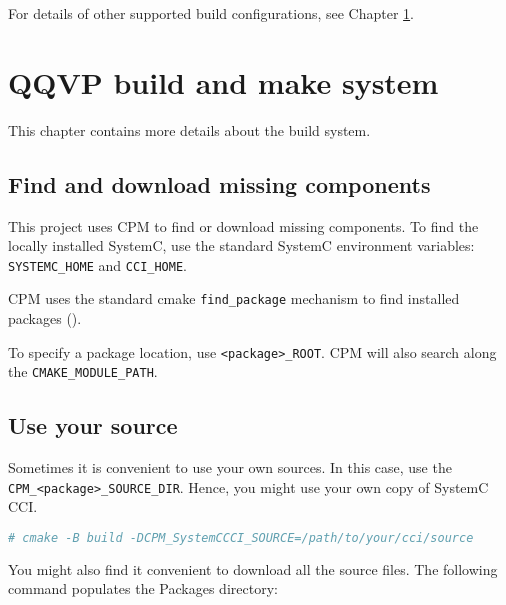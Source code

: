 For details of other supported build configurations, see Chapter \ref{ch:gs-build-make-system}.



\chapter{QQVP build and make system}
\label{ch:gs-build-make-system}

This chapter contains more details about the build system.


\section{Find and download missing components}

This project uses CPM {} to find or download missing components. To find the locally installed SystemC, use the standard SystemC environment variables: {\small{\lstinline!SYSTEMC_HOME!}} and {\small{\lstinline!CCI_HOME!}}. \leavevmode

CPM uses the standard cmake {\small{\lstinline!find_package!}} mechanism to find installed packages ({}). \leavevmode

To specify a package location, use {\small{\lstinline!<package>_ROOT!}}. CPM will also search along the {\small{\lstinline!CMAKE_MODULE_PATH!}}. \leavevmode


\section{Use your source}

Sometimes it is convenient to use your own sources. In this case, use the {\small{\lstinline!CPM_<package>_SOURCE_DIR!}}. Hence, you might use your own copy of SystemC CCI.

\small
\begin{lstlisting}[language=bash]
    # cmake -B build -DCPM_SystemCCCI_SOURCE=/path/to/your/cci/source
\end{lstlisting}
\normalsize

You might also find it convenient to download all the source files. The following command populates the Packages directory:

